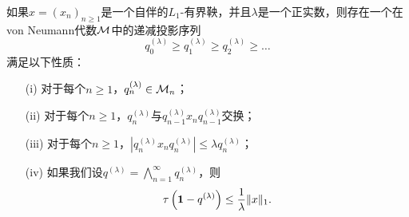 \begin{proposition}\label{Cuculescu}
如果$x=(x_{n})_{n\ge 1}$是一个自伴的$L_1$-有界鞅，并且$\lambda$是一个正实数，则存在一个在von Neumann代数$\mathcal{M}$中的递减投影序列
$$q_0^{(\lambda)} \geq q_1^{(\lambda)} \geq q_2^{(\lambda)} \geq \ldots$$
满足以下性质：
\begin{itemize}
\item[(i)] 对于每个$n\ge 1$，$q_{n}^{(\lambda)}\in \mathcal{M}_{n}$；
\item[(ii)] 对于每个$n\ge 1$，$q_{n}^{(\lambda)}$与$q_{n-1}^{(\lambda)}x_{n}q_{n-1}^{(\lambda)}$交换；
\item[(iii)] 对于每个$n\ge 1$，$|q_{n}^{(\lambda)}x_{n}q_{n}^{(\lambda)}|\leq \lambda q_{n}^{(\lambda)}$；
\item[(iv)] 如果我们设$q^{(\lambda)}=\bigwedge_{n=1}^{\infty}q_{n}^{(\lambda)}$，则$$\tau\left({\bf 1}-q^{(\lambda)}\right)\leq \frac{1}{\lambda}\|x\|_1.$$
\end{itemize}\end{proposition}

